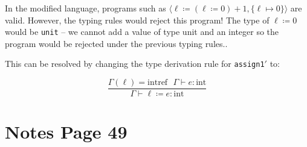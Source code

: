 \documentclass[10pt,\jkfside,a4paper]{article}
\begin{document}
\begin{enumerate}
In the modified language, programs such as $\langle \ell \coloneqq (\ell \coloneqq 0) + 1,
\{\ell\mapsto 0\}\rangle$ are valid. However, the typing rules would reject
this program! The type of $\ell \coloneqq 0$ would be \texttt{unit} -- we cannot
add a value of type unit and an integer so the program would be rejected
under the previous typing rules..

This can be resolved by changing the type derivation rule for
\texttt{assign1}$'$ to:

\[
\dfrac{\Gamma(\ell) = \text{intref} \ \ \ \Gamma \vdash e: \text{int}}{\Gamma
\vdash\ell \coloneqq e: \text{int}}
\]

\end{enumerate}

\section{Notes Page 49}
\end{document}
